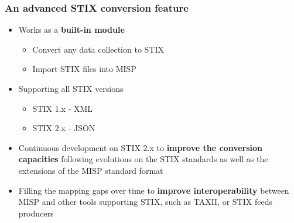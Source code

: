 \begin{frame}
    \frametitle{An advanced STIX conversion feature}
    \begin{itemize}
        \item Works as a \textbf{built-in module}
        \begin{itemize}
            \item Convert any data collection to STIX
            \item Import STIX files into MISP
        \end{itemize}
        \item Supporting all STIX versions
        \begin{itemize}
            \item STIX 1.x - XML
            \item STIX 2.x - JSON
        \end{itemize}
        \item Continuous development on STIX 2.x to \textbf{improve the conversion capacities} following evolutions on the STIX standards as well as the extensions of the MISP standard format
        \item Filling the mapping gaps over time to \textbf{improve interoperability} between MISP and other tools supporting STIX, such as TAXII, or STIX feeds producers
    \end{itemize}
\end{frame}

